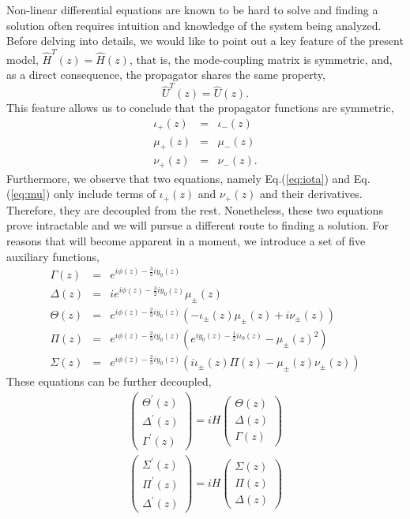 \documentclass[9pt,twocolumn,twoside]{osajnl}
\begin{document}
Non-linear differential equations are known to be hard to solve and finding a solution 
often requires intuition and knowledge of the system being analyzed. 
Before delving into details, we would like to point out a key feature of the present model, $\hat{H}^{T}(z) = \hat{H}(z)$, that is, the mode-coupling matrix is symmetric, and, as a direct consequence, the propagator shares the same property,
\begin{equation}  
	\hat{U}^{T}(z)=\hat{U}(z).
\end{equation} 
This feature allows us to conclude that the propagator functions are symmetric,
\begin{eqnarray}
	\iota_{+}(z)&=&\iota_{-}(z) \label{eq:sym1}\\
	\mu_{+}(z)&=&\mu_{-}(z)\\
	\nu_{+}(z)&=&\nu_{-}(z) . \label{eq:sym3}
\end{eqnarray}
Furthermore, we observe that two equations, namely Eq.(\ref{eq:iota}) and Eq.(\ref{eq:mu}) only include terms of $\iota_{+}(z)$ and $\nu_{+}(z)$ and their derivatives. 
Therefore, they are decoupled from the rest. 
Nonetheless, these two equations prove intractable and we will pursue a different route to finding a solution.
For reasons that will become apparent in a moment, we introduce a set of five auxiliary functions,
\begin{eqnarray}
	\Gamma(z) &=& e^{i \phi(z)-\frac{3}{2} i y_{0}(z)} \\
	\Delta(z)&=& i e^{i \phi(z)-\frac{3}{2} i y_{0}(z)} \mu_{\pm}(z) \\
	   \Theta(z)&=& e^{i \phi(z)-\frac{2}{3}i y_0(z)} (-\iota_{\pm}(z) \mu_{\pm}(z) + i \nu_{\pm}(z)) \\
	\Pi(z)&=& e^{i \phi(z)-\frac{2}{3} i y_{0} (z)}
	    (e^{i y_0 (z)-\frac{1}{2} i \iota_0 (z)}
		-\mu_{\pm} (z)^2) \\
	\Sigma(z)&=& e^{i \phi(z)-\frac{2}{3} i y_0(z)} (i \iota_{\pm}(z) \Pi(z)-\mu_{\pm} (z) \nu_{\pm}(z))
\end{eqnarray}
These equations can be further decoupled,
\begin{eqnarray}
	\left( \begin{array}{c}
		\Theta^{\prime}(z) \\
	\Delta^{\prime}(z) \\
	\Gamma^{\prime}(z) 
		\end{array} \right)=iH 
		\left( \begin{array}{c}
	\Theta(z) \\
	\Delta(z) \\
		\Gamma(z) 
	\end{array} \right) \label{eq:set1}\\
	\left( \begin{array}{c}
	\Sigma^{\prime}(z) \\
	\Pi^{\prime} (z) \\
	\Delta^{\prime}(z) 
	\end{array} \right)=iH 
	\left( \begin{array}{c}
	\Sigma(z) \label{eq:set2}\\
	\Pi (z) \\
	\Delta(z)  
	\end{array} \right)
	\end{eqnarray}
\end{document}
